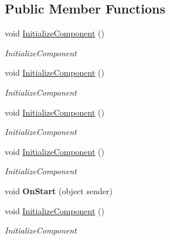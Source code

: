 \subsection*{Public Member Functions}
\begin{DoxyCompactItemize}
\item 
void \mbox{\hyperlink{class_teacher_handbook_1_1_plugins_1_1_schedule_1_1_schedule_a4e0847c918304d0ce088671e13e8f9a6}{Initialize\+Component}} ()
\begin{DoxyCompactList}\small\item\em Initialize\+Component \end{DoxyCompactList}\item 
void \mbox{\hyperlink{class_teacher_handbook_1_1_plugins_1_1_schedule_1_1_schedule_a4e0847c918304d0ce088671e13e8f9a6}{Initialize\+Component}} ()
\begin{DoxyCompactList}\small\item\em Initialize\+Component \end{DoxyCompactList}\item 
void \mbox{\hyperlink{class_teacher_handbook_1_1_plugins_1_1_schedule_1_1_schedule_a4e0847c918304d0ce088671e13e8f9a6}{Initialize\+Component}} ()
\begin{DoxyCompactList}\small\item\em Initialize\+Component \end{DoxyCompactList}\item 
void \mbox{\hyperlink{class_teacher_handbook_1_1_plugins_1_1_schedule_1_1_schedule_a4e0847c918304d0ce088671e13e8f9a6}{Initialize\+Component}} ()
\begin{DoxyCompactList}\small\item\em Initialize\+Component \end{DoxyCompactList}\item 
\mbox{\label{class_teacher_handbook_1_1_plugins_1_1_schedule_1_1_schedule_a8f74818aad2b85eea41959b41e4572bd}} 
void {\bfseries On\+Start} (object sender)
\item 
void \mbox{\hyperlink{class_teacher_handbook_1_1_plugins_1_1_schedule_1_1_schedule_a4e0847c918304d0ce088671e13e8f9a6}{Initialize\+Component}} ()
\begin{DoxyCompactList}\small\item\em Initialize\+Component \end{DoxyCompactList}\end{DoxyCompactItemize}
